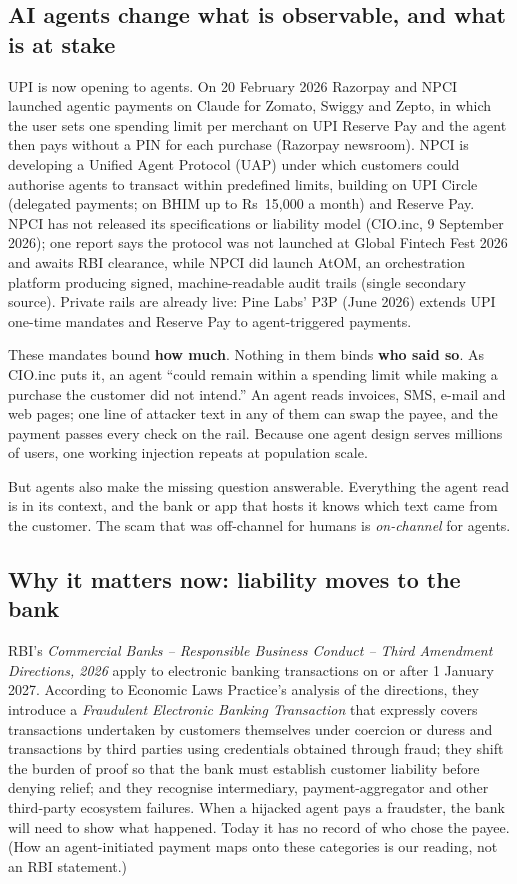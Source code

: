 \documentclass[10pt,a4paper]{article}
\newcommand{\Rs}{Rs~}
\begin{document}
\subsection{AI agents change what is observable, and what is at stake}
UPI is now opening to agents. On 20 February 2026 Razorpay and NPCI launched agentic payments on Claude for Zomato, Swiggy
and Zepto, in which the user sets one spending limit per merchant on UPI Reserve Pay and the agent then pays without a PIN
for each purchase (Razorpay newsroom). NPCI is developing a Unified Agent Protocol (UAP) under which customers could
authorise agents to transact within predefined limits, building on UPI Circle (delegated payments; on BHIM up to \Rs15,000
a month) and Reserve Pay. NPCI has not released its specifications or liability model (CIO.inc, 9 September 2026); one
report says the protocol was not launched at Global Fintech Fest 2026 and awaits RBI clearance, while NPCI did launch AtOM,
an orchestration platform producing signed, machine-readable audit trails (single secondary source). Private rails are
already live: Pine Labs' P3P (June 2026) extends UPI one-time mandates and Reserve Pay to agent-triggered payments.

These mandates bound \textbf{how much}. Nothing in them binds \textbf{who said so}. As CIO.inc puts it, an agent ``could
remain within a spending limit while making a purchase the customer did not intend.'' An agent reads invoices, SMS, e-mail
and web pages; one line of attacker text in any of them can swap the payee, and the payment passes every check on the rail.
Because one agent design serves millions of users, one working injection repeats at population scale.

But agents also make the missing question answerable. Everything the agent read is in its context, and the bank or app that
hosts it knows which text came from the customer. The scam that was off-channel for humans is \emph{on-channel} for agents.

\subsection{Why it matters now: liability moves to the bank}
RBI's \emph{Commercial Banks -- Responsible Business Conduct -- Third Amendment Directions, 2026} apply to electronic banking
transactions on or after 1 January 2027. According to Economic Laws Practice's analysis of the directions, they introduce
a \emph{Fraudulent Electronic Banking Transaction} that expressly covers transactions undertaken by customers themselves
under coercion or duress and transactions by third parties using credentials obtained through fraud; they shift the burden
of proof so that the bank must establish customer liability before denying relief; and they recognise intermediary,
payment-aggregator and other third-party ecosystem failures. When a hijacked agent pays a fraudster, the bank will need to
show what happened. Today it has no record of who chose the payee. (How an agent-initiated payment maps onto these
categories is our reading, not an RBI statement.)
\end{document}
